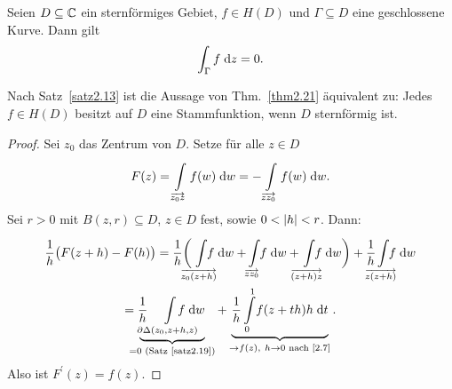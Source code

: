\documentclass[a4paper,twoside,DIV15,BCOR12mm]{scrbook}
\begin{document}
\begin{center}
\end{center}

\begin{thm} \label{thm2.21}
  Seien $D\subseteq\mathbb{C}$ ein sternförmiges Gebiet, $f\in H(D)$ und $\Gamma\subseteq D$ eine geschlossene Kurve. Dann gilt
  \[\int_{\Gamma}^{}{f}\;\mathrm{d} z = 0.\]
\end{thm}
\begin{bem*}
  Nach Satz~\ref{satz2.13} ist die Aussage von Thm.~\ref{thm2.21} äquivalent zu: Jedes $f\in H(D)$ besitzt auf $D$ eine
  Stammfunktion, wenn $D$ sternförmig ist.
\end{bem*}
\begin{proof}
  Sei $z_0$ das Zentrum von $D$. Setze für alle $z\in D$
  \[F(z) = \int\limits_{\overrightarrow{z_0z}}^{}{f(w)}\;\mathrm{d}w = -\int\limits_{\overrightarrow{zz_0}}^{}{f(w)}\;\mathrm{d}w.\]
  Sei $r>0$ mit $B(z,r)\subseteq D$, $z\in D$ fest, sowie $0<\left\lvert h\right\lvert<r$. Dann:
  \begin{multline*}
    \frac1h \bigl(F(z+h)-F(h)\bigr) = \frac1h \biggl(\!\!\!\!\Integral{\overrightarrow{z_0(z+h)}}{}{\!\!\!\!\!\!\!f}{w} + \!
      \Integral{\overrightarrow{zz_0}}{}{\!\!f}{w} + \!\!\!\!\Integral{\overrightarrow{(z+h)z}}{}{\!\!\!\!\!\!f}{w} \biggr) + \frac1h
      \!\!\!\!\!\Integral{\overrightarrow{z(z+h)}}{}{\!\!\!\!\!\!f}{w}  \\
    = \frac1h \!\!\!\!\!\!\!\!\!\!\underbrace{\Integral{\partial\Delta(z_0,z+h,z)}{}{\!\!\!\!\!\!\!\!\!\!\!\!f}{w}}_{=0 \text{
        (Satz~\ref{satz2.19})}} + \underbrace{\frac1h \Integral{0}{1}{\!f(z+th)h}{t}}_{\to f(z),\ h\to0 \text { nach \eqref{2.7}}}.
  \end{multline*}
  Also ist $F^\prime(z)=f(z)$.
\end{proof}
\end{document}
